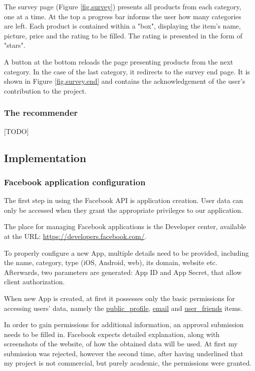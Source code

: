 \documentclass[12pt]{report}
\begin{document}
The survey page (Figure \ref{fig.survey}) presents all products from each category, one at a time. At the top a progress bar informs the user how many categories are left. Each product is contained within a "box", displaying the item's name, picture, price and the rating to be filled. The rating is presented in the form of "stars".

A button at the bottom reloads the page presenting products from the next category. In the case of the last category, it redirects to the survey end page. It is shown in Figure \ref{fig.survey.end} and contains the acknowledgement of the user's contribution to the project.

\subsubsection{The recommender}
[TODO]

\subsection{Implementation}

\subsubsection{Facebook application configuration}
The first step in using the Facebook API is application creation. User data can only be accessed when they grant the appropriate privileges to our application.

The place for managing Facebook applications is the Developer center, available at the URL: \url{https://developers.facebook.com/}.

To properly configure a new App, multiple details need to be provided, including the name, category, type (iOS, Android, web), its domain, website etc. Afterwards, two parameters are generated: App ID and App Secret, that allow client authorization.

When new App is created, at first it possesses only the basic permissions for accessing users' data, namely the \url{public_profile}, \url{email} and \url{user_friends} items.

In order to gain permissions for additional information, an approval submission needs to be filled in. Facebook expects detailed explanation, along with screenshots of the website, of how the obtained data will be used. At first my submission was rejected, however the second time, after having underlined that my project is not commercial, but purely academic, the permissions were granted.
\end{document}
